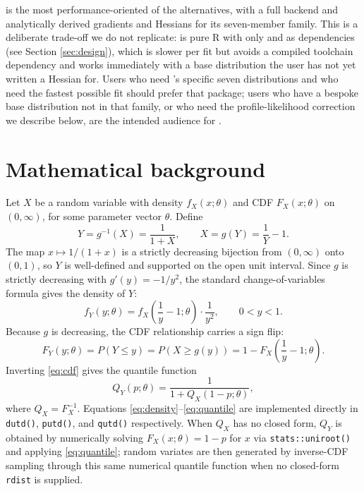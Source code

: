  is the most performance-oriented of the alternatives,
with a full  backend and analytically derived
gradients and Hessians for its seven-member family. This is a
deliberate trade-off we do not replicate:  is
pure R with only  and  as dependencies (see
Section \ref{sec:design}), which is slower per fit but avoids a compiled
toolchain dependency and works immediately with a base distribution the
user has not yet written a Hessian for. Users who need
's specific seven distributions and who need the fastest
possible fit should prefer that package; users who have a bespoke base
distribution not in that family, or who need the profile-likelihood
correction we describe below, are the intended audience for
.

\section{Mathematical background}
\label{sec:math}

Let $X$ be a random variable with density $f_X(x;\theta)$ and CDF
$F_X(x;\theta)$ on $(0,\infty)$, for some parameter vector $\theta$.
Define
\begin{equation}
  Y = g^{-1}(X) = \frac{1}{1+X}, \qquad X = g(Y) = \frac{1}{Y} - 1.
\end{equation}
The map $x \mapsto 1/(1+x)$ is a strictly decreasing bijection from
$(0,\infty)$ onto $(0,1)$, so $Y$ is well-defined and supported on the
open unit interval. Since $g$ is strictly decreasing with
$g'(y) = -1/y^2$, the standard change-of-variables formula gives the
density of $Y$:
\begin{equation}
  f_Y(y;\theta) = f_X\!\left(\frac{1}{y}-1;\theta\right)\cdot\frac{1}{y^2},
  \qquad 0<y<1.
  \label{eq:density}
\end{equation}
Because $g$ is decreasing, the CDF relationship carries a sign flip:
\begin{equation}
  F_Y(y;\theta) = P(Y \le y) = P(X \ge g(y)) = 1 - F_X\!\left(\frac{1}{y}-1;\theta\right).
  \label{eq:cdf}
\end{equation}
Inverting \eqref{eq:cdf} gives the quantile function
\begin{equation}
  Q_Y(p;\theta) = \frac{1}{1+Q_X(1-p;\theta)},
  \label{eq:quantile}
\end{equation}
where $Q_X = F_X^{-1}$. Equations \eqref{eq:density}--\eqref{eq:quantile}
are implemented directly in \texttt{dutd()}, \texttt{putd()}, and
\texttt{qutd()} respectively. When $Q_X$ has no closed form, $Q_Y$ is
obtained by numerically solving $F_X(x;\theta) = 1-p$ for $x$ via
\texttt{stats::uniroot()} and applying \eqref{eq:quantile}; random
variates are then generated by inverse-CDF sampling through this same
numerical quantile function when no closed-form \texttt{rdist} is
supplied.

